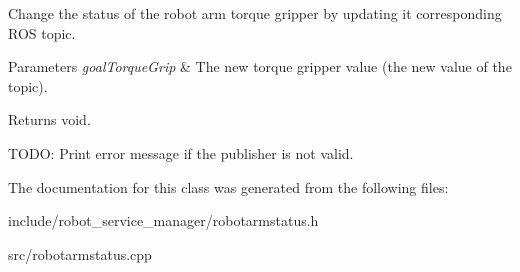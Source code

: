 Change the status of the robot arm torque gripper by updating it corresponding R\+OS topic. 


\begin{DoxyParams}{Parameters}
{\em goal\+Torque\+Grip} & The new torque gripper value (the new value of the topic). \\
\hline
\end{DoxyParams}
\begin{DoxyReturn}{Returns}
void. 
\end{DoxyReturn}
T\+O\+DO\+: Print error message if the publisher is not valid.

The documentation for this class was generated from the following files\+:\begin{DoxyCompactItemize}
\item 
include/robot\+\_\+service\+\_\+manager/robotarmstatus.\+h\item 
src/robotarmstatus.\+cpp\end{DoxyCompactItemize}
